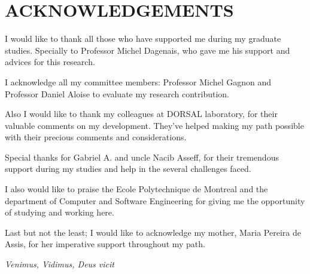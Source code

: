 %
\chapter*{ACKNOWLEDGEMENTS}\thispagestyle{headings}
%
I would like to thank all those who have supported me during my graduate studies. Specially to Professor Michel Dagenais, who gave me his support and advices for this research.
 
I acknowledge all my committee members: Professor Michel Gagnon and Professor Daniel Aloise to evaluate my research contribution.
 
 Also I would like to thank my colleagues at DORSAL laboratory, for their valuable comments on my development. They’ve helped making my path possible with their precious comments and considerations.
 
Special thanks for Gabriel A. and uncle Nacib Asseff, for their tremendous support during my studies and help in the several challenges faced.
 
I also would like to praise the Ecole Polytechnique de Montreal and the department of Computer and Software Engineering for giving me the opportunity of studying and working here. 
 
 Last but not the least; I would like to acknowledge my mother, Maria Pereira de Assis, for her imperative support throughout my path. 
 
\begin{flushleft}
\textit{Venimus, Vidimus, Deus vicit}
\end{flushleft}
